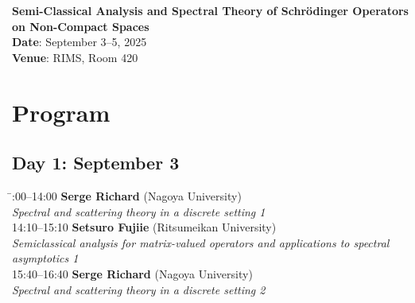 \documentclass[a4paper,11pt]{article}
\numberwithin{equation}{section}
\begin{document}
\pagestyle{empty}

\begin{center}
  {\LARGE\bfseries Semi-Classical Analysis and Spectral Theory of Schrödinger Operators on Non-Compact Spaces}\\[1ex]


  \textbf{Date}: September 3--5, 2025\\
  \textbf{Venue}: RIMS, Room 420
\end{center}

\vspace{1ex}

\section*{Program}

\subsection*{Day 1: September 3}
\begin{tabbing}
  \hspace{3cm}\=:00--14:00 \> \textbf{Serge Richard}  (Nagoya University)\\
                \> \emph{Spectral and scattering theory in a discrete setting 1}\\

  14:10--15:10 \> \textbf{Setsuro Fujiie}  (Ritsumeikan University)\\
                \> \emph{Semiclassical analysis for matrix-valued operators
and applications to spectral}\\
               \> \emph{ asymptotics 1}\\[1ex]

  15:40--16:40 \> \textbf{Serge Richard}  (Nagoya University)\\
                \> \emph{Spectral and scattering theory in a discrete setting 2}
\end{tabbing}
\end{document}
